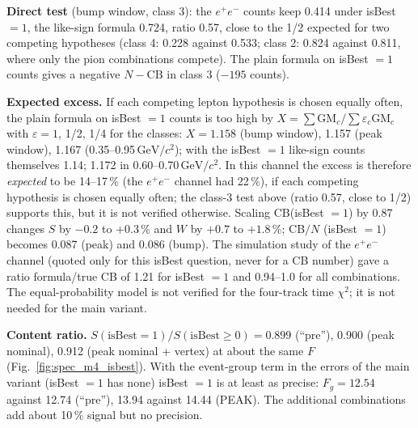 \documentclass[11pt,a4paper]{article}
\newcommand{\ee}{\ensuremath{e^{+}e^{-}}\xspace}
\newcommand{\GeVcc}{\ensuremath{\mathrm{GeV}/c^{2}}\xspace}
\begin{document}
\textbf{Direct test} (bump window, class 3): the \ee counts keep 0.414 under isBest $=1$, the like-sign formula 0.724,
ratio 0.57, close to the 1/2 expected for two competing hypotheses (class 4: 0.228 against 0.533; class 2: 0.824
against 0.811, where only the pion combinations compete). The plain formula on isBest $=1$ counts gives a negative
$N-\mathrm{CB}$ in class 3 ($-195$ counts).

\textbf{Expected excess.} If each competing lepton hypothesis is chosen equally often, the plain formula on
isBest $=1$ counts is too high by $X=\sum\mathrm{GM}_c/\sum\varepsilon_c\mathrm{GM}_c$ with $\varepsilon=1$, 1/2, 1/4 for the
classes: $X=1.158$ (bump window), 1.157 (peak window), 1.167 (0.35--0.95\,\GeVcc); with the isBest $=1$ like-sign counts
themselves 1.14; 1.172 in 0.60--0.70\,\GeVcc. In this channel the excess is therefore \emph{expected} to be 14--17\,\%
(the \ee channel had 22\,\%), if each competing hypothesis is chosen equally often; the class-3 test above (ratio 0.57,
close to 1/2) supports this, but it is not verified otherwise. Scaling CB(isBest $=1$)
by 0.87 changes $S$ by $-0.2$ to $+0.3$\,\% and $W$ by $+0.7$ to $+1.8$\,\%; CB$/N$ (isBest $=1$) becomes 0.087 (peak)
and 0.086 (bump). The simulation study of the \ee channel (quoted only for this isBest question, never for a CB number) gave a ratio
formula/true CB of 1.21 for isBest $=1$ and 0.94--1.0 for all combinations. The equal-probability model is
not verified for the four-track time $\chi^2$; it is not needed for the main variant.

\textbf{Content ratio.} $S(\text{isBest}=1)/S(\text{isBest}\ge0)=0.899$ (``pre''), 0.900 (peak nominal), 0.912 (peak
nominal + vertex) at about the same $F$ (Fig.~\ref{fig:spec_m4_isbest}). With the event-group term in the errors of the
main variant (isBest $=1$ has none) isBest $=1$ is at least as precise: $F_g=12.54$ against 12.74 (``pre''), 13.94 against
14.44 (PEAK). The additional combinations add about 10\,\% signal but no precision.
\end{document}
